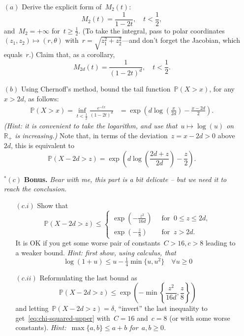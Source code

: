 \documentclass[11pt]{article}
\newcommand{\R}{\mathds{R}}
\newcommand{\Prob}{\mathds{P}}
\newcommand{\leqs}{\leqslant}
\newcommand{\geqs}{\geqslant}
\renewcommand{\le}{\leqs}
\renewcommand{\ge}{\geqs}
\begin{document}
\begin{itemize}
\item[$(a)$] Derive the explicit form of~$M_2(t)$:
\[
M_2(t) 
= \frac{1}{1-2t}, \quad t < \frac{1}{2},
\]
and~$M_{2} = + \infty$ for~$t \ge \frac{1}{2}$. 
(To take the integral, pass to polar coordinates~$(z_1,z_2) \mapsto (r,\theta)$ with~$r = \sqrt{z_1^2 + z_2^2}$---and don't forget the Jacobian, which equals~$r$.)
Claim that, as a corollary, 
\[
M_{2d}(t) 
= \frac{1}{(1-2t)^{d}}, \quad t < \frac{1}{2}.
\]
\item[$(b)$]
Using Chernoff's method, bound the tail function~$\Prob(X > x)$, for any~$x > 2d$, as follows:
\[
\begin{aligned}
\Prob(X > x) = \inf_{t < \frac{1}{2}} \frac{e^{-tx}}{(1-2t)^d} 
&= \exp \left( d \log\left(\frac{x}{2d}\right) - \frac{x-2d}{2} \right).
\end{aligned}
\]
{\em (Hint: it is convenient to take the logarithm, and use that~$u \mapsto \log(u)$ on~$\R_+$ is increasing.)}
Note that, in terms of the deviation~$z = x-2d > 0$ above~$2d$, this is equivalent to
\[
\Prob(X - 2d > z) = \exp \left( d \log\left(\frac{2d+z}{2d}\right) - \frac{z}{2} \right).
\]

\item[{$^*(c)$}]
{\bf Bonus.} {\em Bear with me, this part is a bit delicate -- but we need it to reach the conclusion.}

\begin{itemize}
\item[$(c.i)$] 
Show that
\[
\Prob(X - 2d > z) 
\le \left\{
	\begin{aligned}
	\exp\left( -\frac{z^2}{16d} \right) \;\; & \text{for} \;\; 0 \le z \le 2d, \\
	\exp\left( -\frac{z}{8} \right) \;\; & \text{for} \;\; z > 2d.
	\end{aligned}
\right.
\]
It is OK if you get some worse pair of constants~$C > 16, c > 8$ leading to a weaker bound.
\em Hint: first show, using calculus, that 
\[
\log(1+u) \le u -\tfrac{1}{4} \min\{u,u^2\} \quad \forall u \ge 0
\]
\item[$(c.ii)$] Reformulating the last bound as
\[
\Prob(X - 2d > z) \le \exp \left( -\min \left\{\frac{z^2}{16d}, \frac{z}{8} \right\} \right)
\]
and letting~$\Prob(X - 2d > z) = \delta$, ``invert'' the last inequality to get~\eqref{eq:chi-squared-upper} with~$C = 16$ and~$c = 8$ (or with some worse constants). {\em Hint:~$\max\{a,b\} \le a+b$ for~$a, b \ge 0$.}
\end{itemize}
\end{itemize}
\end{document}

